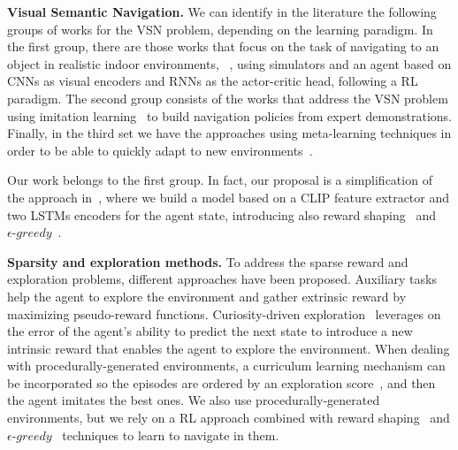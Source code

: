 \textbf{Visual Semantic Navigation.} We can identify in the literature the following groups of works for the VSN problem, depending on the learning paradigm.
In the first group, there are those works that focus on the task of navigating to an object in realistic indoor environments, \eg~\cite{zhu2017, wijmans2020, chang2020, khandelwal2022}, using simulators and an agent based on CNNs as visual encoders and RNNs as the actor-critic head, following a RL paradigm.
The second group consists of the works that address the VSN problem using imitation learning~\cite{wu2020a, ramrakhya2022} to build navigation policies from expert demonstrations.
Finally, in the third set we have the approaches using meta-learning techniques in order to be able to quickly adapt to new environments~\cite{wang2017, wortsman2019, zhang2022}.

Our work belongs to the first group.
In fact, our proposal is a simplification of the approach in~\cite{khandelwal2022}, where we build a model based on a CLIP feature extractor and two LSTMs encoders for the agent state, introducing also reward shaping~\cite{wijmans2020} and $\epsilon\text{-}greedy$~\cite{mnih2013}.

\textbf{Sparsity and exploration methods.} To address the sparse reward and exploration problems, different approaches have been proposed.
Auxiliary tasks~\cite{jaderberg2016, ye2021} help the agent to explore the environment and gather extrinsic reward by maximizing pseudo-reward functions.
Curiosity-driven exploration~\cite{pathak2017} leverages on the error of the agent's ability to predict the next state to introduce a new intrinsic reward that enables the agent to explore the environment.
When dealing with procedurally-generated environments, a curriculum learning mechanism can be incorporated so the episodes are ordered by an exploration score~\cite{zha2020b}, and then the agent imitates the best ones.
We also use procedurally-generated environments, but we rely on a RL approach combined with reward shaping~\cite{ng1999, jestel2021} and $\epsilon\text{-}greedy$~\cite{mnih2013} techniques to learn to navigate in them.
